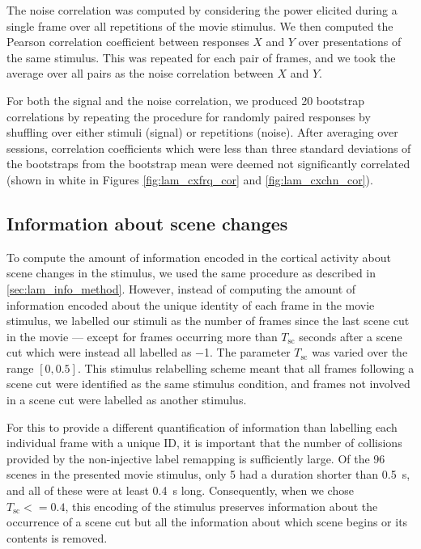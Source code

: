 The noise correlation was computed by considering the power elicited during a single frame over all repetitions of the movie stimulus.
We then computed the Pearson correlation coefficient between responses $X$ and $Y$ over presentations of the same stimulus.
This was repeated for each pair of frames, and we took the average over all pairs as the noise correlation between $X$ and $Y$.

For both the signal and the noise correlation, we produced \num{20} bootstrap correlations by repeating the procedure for randomly paired responses by shuffling over either stimuli (signal) or repetitions (noise).
After averaging over sessions, correlation coefficients which were less than three standard deviations of the bootstraps from the bootstrap mean were deemed not significantly correlated (shown in white in Figures \ref{fig:lam_cxfrq_cor} and \ref{fig:lam_cxchn_cor}).


\subsection{Information about scene changes}
\label{sec:lam_scnchg_method}

To compute the amount of information encoded in the cortical activity about scene changes in the stimulus, we used the same procedure as described in \autoref{sec:lam_info_method}.
However, instead of computing the amount of information encoded about the unique identity of each frame in the movie stimulus, we labelled our stimuli as the number of frames since the last scene cut in the movie --- except for frames occurring more than $T_\text{sc}$ seconds after a scene cut which were instead all labelled as \num{-1}.
The parameter $T_\text{sc}$ was varied over the range $[0, 0.5]$.
This stimulus relabelling scheme meant that all frames following a scene cut were identified as the same stimulus condition, and frames not involved in a scene cut were labelled as another stimulus.

For this to provide a different quantification of information than labelling each individual frame with a unique ID, it is important that the number of collisions provided by the non-injective label remapping is sufficiently large.
Of the \num{96} scenes in the presented movie stimulus, only \num{5} had a duration shorter than \SI{0.5}{\second}, and all of these were at least \SI{0.4}{\second} long.
Consequently, when we chose $T_\text{sc} <= 0.4$, this encoding of the stimulus preserves information about the occurrence of a scene cut but all the information about which scene begins or its contents is removed.

